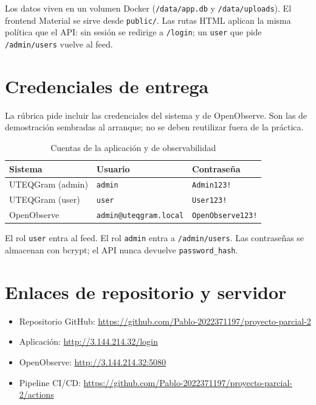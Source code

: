 \documentclass[12pt,letterpaper]{article}
\begin{document}
Los datos viven en un volumen Docker (\texttt{/data/app.db} y \texttt{/data/uploads}). El frontend Material se sirve desde \texttt{public/}. Las rutas HTML aplican la misma pol\'itica que el API: sin sesi\'on se redirige a \texttt{/login}; un \texttt{user} que pide \texttt{/admin/users} vuelve al feed.

\section{Credenciales de entrega}

La r\'ubrica pide incluir las credenciales del sistema y de OpenObserve. Son las de demostraci\'on sembradas al arranque; no se deben reutilizar fuera de la pr\'actica.

\begin{table}[h]
\centering
\caption{Cuentas de la aplicaci\'on y de observabilidad}
\begin{tabular}{|p{3.2cm}|p{4.6cm}|p{5.4cm}|}
\hline
\textbf{Sistema} & \textbf{Usuario} & \textbf{Contrase\~na} \\
\hline
UTEQGram (admin) & \texttt{admin} & \texttt{Admin123!} \\
\hline
UTEQGram (user) & \texttt{user} & \texttt{User123!} \\
\hline
OpenObserve & \texttt{admin@uteqgram.local} & \texttt{OpenObserve123!} \\
\hline
\end{tabular}
\end{table}

El rol \texttt{user} entra al feed. El rol \texttt{admin} entra a \texttt{/admin/users}. Las contrase\~nas se almacenan con bcrypt; el API nunca devuelve \texttt{password\_hash}.

\section{Enlaces de repositorio y servidor}

\begin{itemize}
\item Repositorio GitHub: \url{https://github.com/Pablo-2022371197/proyecto-parcial-2}
\item Aplicaci\'on: \url{http://3.144.214.32/login}
\item OpenObserve: \url{http://3.144.214.32:5080}
\item Pipeline CI/CD: \url{https://github.com/Pablo-2022371197/proyecto-parcial-2/actions}
\end{itemize}
\end{document}
